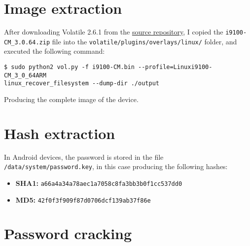 \documentclass[12pt]{article}
\begin{document}


\section{Image extraction}

After downloading Volatile 2.6.1 from the \href{https://github.com/volatilityfoundation/volatility/releases/tag/2.6.1}{source repository}, I copied the \texttt{i9100-CM\_3.0.64.zip} file into the \texttt{volatile/plugins/overlays/linux/} folder, and executed the following command:

\begin{lstlisting}
$ sudo python2 vol.py -f i9100-CM.bin --profile=Linuxi9100-CM_3_0_64ARM 
linux_recover_filesystem --dump-dir ./output
\end{lstlisting}

Producing the complete image of the device.


\section{Hash extraction}

In Android devices, the password is stored in the file \texttt{/data/system/password.key}, in this case producing the following hashes:
\begin{itemize}
    \item \textbf{SHA1:} \texttt{a66a4a34a78aec1a7058c8fa3bb3b0f1cc537dd0}
    \item \textbf{MD5:} \texttt{42f0f3f909f87d0706dcf139ab37f86e}
\end{itemize}


\section{Password cracking}
\end{document}
